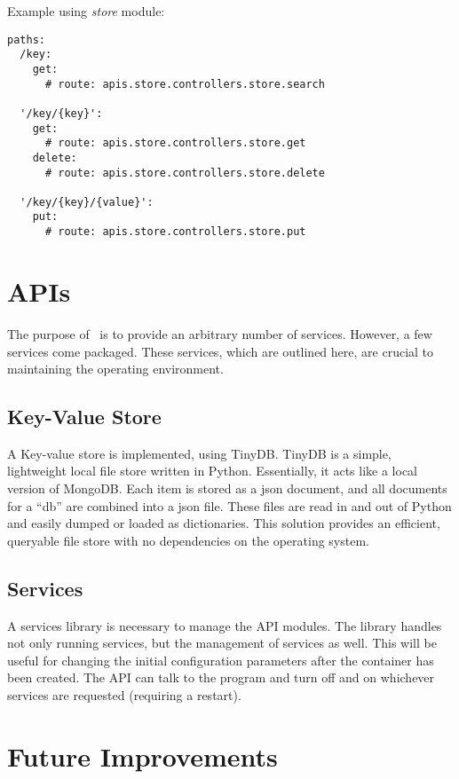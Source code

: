 Example using \textit{store} module:
\begin{verbatim}
paths:
  /key:
    get:
      # route: apis.store.controllers.store.search

  '/key/{key}':
    get:
      # route: apis.store.controllers.store.get
    delete:
      # route: apis.store.controllers.store.delete

  '/key/{key}/{value}':
    put:
      # route: apis.store.controllers.store.put
\end{verbatim}

\section{APIs}

The purpose of \projectname~is to provide an arbitrary number of
services. However, a few services come packaged. These services, which are
outlined here, are crucial to maintaining the operating environment.

\subsection{Key-Value Store}

A Key-value store is implemented, using TinyDB. TinyDB is a simple, lightweight
local file store written in Python. Essentially, it acts like a local version
of MongoDB. Each item is stored as a json document, and all documents for a
``db'' are combined into a json file. These files are read in and out of
Python and easily dumped or loaded as dictionaries. This solution provides
an efficient, queryable file store with no dependencies on the operating
system.\cite{hid-sp18-526-www-tinydb}

\subsection{Services}

A services library is necessary to manage the API modules. The library handles
not only running services, but the management of services as well. This
will be useful for changing the initial configuration parameters after the
container has been created. The API can talk to the program and turn off
and on whichever services are requested (requiring a restart).

\section{Future Improvements}

